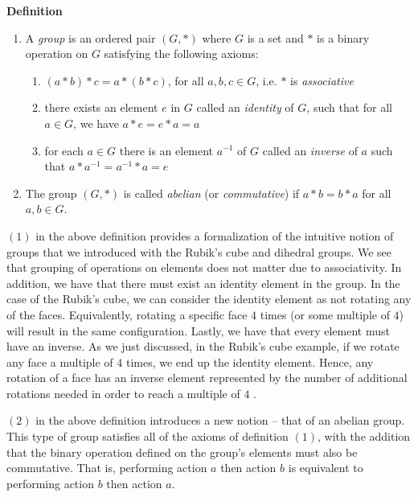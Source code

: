\documentclass[11pt, reqno]{amsart}
\theoremstyle{plain}
\theoremstyle{definition}
\theoremstyle{example}
\begin{document}
\par
\textbf{Definition}
\begin{enumerate}
\item A \textit{group} is an ordered pair $(G, *)$ where $G$ is a set and $*$ is a binary operation on $G$ satisfying the following axioms:

\begin{enumerate}[label=(\roman*)]
\item $(a * b) * c = a * (b * c)$, for all $a, b, c \in G$, i.e. $*$ is \textit{associative}

\item there exists an element $e$ in $G$ called an \textit{identity} of $G$, such that for all $a \in G$, we have $a * e = e * a = a$

\item for each $a \in G$ there is an element $a^{-1}$ of $G$ called an \textit{inverse} of $a$ such that $a * a^{-1} = a^{-1} * a = e$

\end{enumerate}

\item The group $(G, *)$ is called \textit{abelian} (or \textit{commutative}) if $a * b = b * a$ for all $a, b \in G$.
\end{enumerate}

$(1)$ in the above definition provides a formalization of the intuitive notion of groups that we introduced with the Rubik's cube and dihedral groups. We see that grouping of operations on elements does not matter due to associativity. In addition, we have that there must exist an identity element in the group. In the case of the Rubik's cube, we can consider the identity element as not rotating any of the faces. Equivalently, rotating a specific face $4$ times (or some multiple of $4$) will result in the same configuration. Lastly, we have that every element must have an inverse. As we just discussed, in the Rubik's cube example, if we rotate any face a multiple of $4$ times, we end up the identity element. Hence, any rotation of a face has an inverse element represented by the number of additional rotations needed in order to reach a multiple of $4$ \cite{carter}.

\par
$(2)$ in the above definition introduces a new notion -- that of an abelian group. This type of group satisfies all of the axioms of definition $(1)$, with the addition that the binary operation defined on the group's elements must also be commutative. That is, performing action $a$ then action $b$ is equivalent to performing action $b$ then action $a$.
\end{document}
